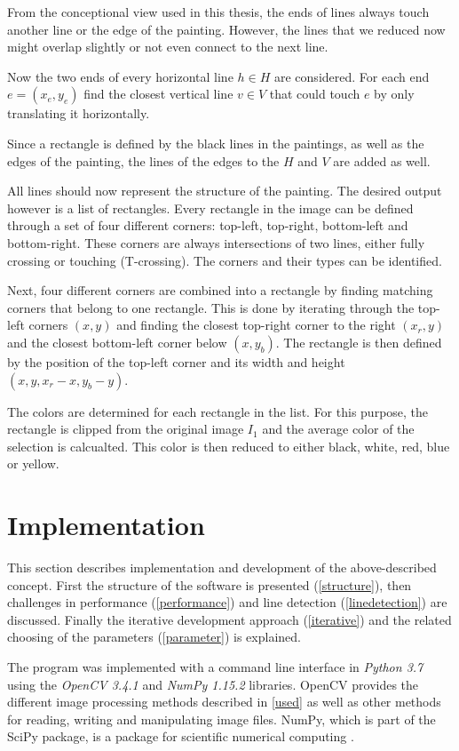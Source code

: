 \documentclass[serif,article,noparskip]{agse-thesis}
\begin{document}
From the conceptional view used in this thesis, the ends of lines always touch
another line or the edge of the painting. However, the lines that we reduced now
might overlap slightly or not even connect to the next line.

Now the two ends of every horizontal line $h \in H$ are considered. For each end
$e = (x_e,y_e)$ find the closest vertical line $v \in V$ that could touch $e$ by
only translating it horizontally.

Since a rectangle is defined by the black lines in the paintings, as well as the
edges of the painting, the lines of the edges to the $H$ and $V$ are added as
well.

All lines should now represent the structure of the painting. The desired output
however is a list of rectangles. Every rectangle in the image can be defined
through a set of four different corners: top-left, top-right, bottom-left and
bottom-right. These corners are always intersections of two lines, either fully
crossing or touching (T-crossing). The corners and their types can be
identified.

Next, four different corners are combined into a rectangle by finding matching
corners that belong to one rectangle. This is done by iterating through the
top-left corners $(x,y)$ and finding the closest top-right corner to the right
$(x_r, y)$ and the closest bottom-left corner below $(x, y_b)$. The rectangle is
then defined by the position of the top-left corner and its width and height
$(x,y,x_r-x,y_b-y)$.

The colors are determined for each rectangle in the list. For this purpose, the
rectangle is clipped from the original image $I_1$ and the average color of the
selection is calcualted. This color is then reduced to either black, white, red,
blue or yellow.

\section{Implementation} \label{implementation}

This section describes implementation and development of the above-described
concept. First the structure of the software is presented (\ref{structure}),
then challenges in performance (\ref{performance}) and line detection
(\ref{linedetection}) are discussed. Finally the iterative development approach
(\ref{iterative}) and the related choosing of the parameters (\ref{parameter})
is explained.

The program was implemented with a command line interface in \textit{Python 3.7}
using the \textit{OpenCV 3.4.1} and \textit{NumPy 1.15.2} libraries. OpenCV
provides the different image processing methods described in \ref{used} as well
as other methods for reading, writing and manipulating image files. NumPy, which
is part of the SciPy package, is a package for scientific numerical computing
\cite{scipy}.
\end{document}
